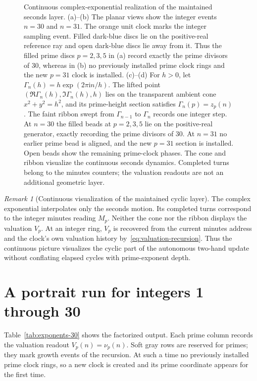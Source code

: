 \documentclass[11pt,a4paper]{article}
\theoremstyle{clockplain}
\theoremstyle{definition}
\theoremstyle{remark}
\newtheorem{remark}[proposition]{Remark}
\begin{document}
\begin{figure}[p]
\caption{Continuous complex-exponential realization of the maintained seconds layer. \textup{(a)--(b)} The planar views show the integer events $n=30$ and $n=31$.  The orange unit clock marks the integer sampling event.  Filled dark-blue discs lie on the positive-real reference ray and open dark-blue discs lie away from it.  Thus the filled prime discs $p=2,3,5$ in \textup{(a)} record exactly the prime divisors of $30$, whereas in \textup{(b)} no previously installed prime clock rings and the new $p=31$ clock is installed.  \textup{(c)--(d)} For $h>0$, let
$\Gamma_n(h)=h\exp(2\pi\mathrm{i}n/h)$.  The lifted point
$(\Re\Gamma_n(h),\Im\Gamma_n(h),h)$ lies on the transparent ambient cone
$x^2+y^2=h^2$, and its prime-height section satisfies
$\Gamma_n(p)=z_p(n)$.  The faint ribbon swept from $\Gamma_{n-1}$ to
$\Gamma_n$ records one integer step.  At $n=30$ the filled beads at
$p=2,3,5$ lie on the positive-real generator, exactly recording the prime
divisors of $30$.  At $n=31$ no earlier prime bead is aligned, and the new
$p=31$ section is installed.  Open beads show the remaining prime-clock
phases.  The cone and ribbon visualize the
continuous seconds dynamics. Completed turns belong to the minutes counters;
the valuation readouts are not an additional geometric layer.}
\label{fig:complex-clockwork}
\end{figure}

\begin{remark}[Continuous visualization of the maintained cyclic layer]
The complex exponential interpolates only the seconds motion. Its completed turns correspond to the integer minutes reading $M_p$. Neither the cone nor the ribbon displays the valuation $V_p$. At an integer ring, $V_p$ is recovered from the current minutes address and the clock's own valuation history by~\eqref{eq:valuation-recursion}. Thus the continuous picture visualizes the cyclic part of the autonomous two-hand update without conflating elapsed cycles with prime-exponent depth.
\end{remark}

\clearpage
\section{A portrait run for integers 1 through 30}
\label{app:tables}


Table~\ref{tab:exponents-30} shows the factorized output. Each prime column records the valuation readout $V_p(n)=\nu_p(n)$. Soft gray rows are reserved for primes; they mark growth events of the recursion. At such a time no previously installed prime clock rings, so a new clock is created and its prime coordinate appears for the first time.
\end{document}
